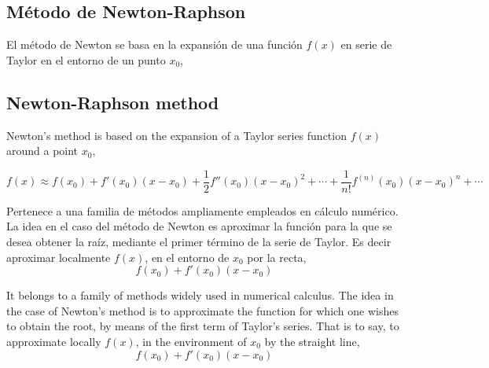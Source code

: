 
%

\begin{paracol}{2}
\subsection{Método de Newton-Raphson}
El método de Newton se basa en la expansión de una función $f(x)$ en serie de Taylor en el entorno de un punto $x_0$,

\switchcolumn
\subsection{Newton-Raphson method}
Newton's method is based on the expansion of a Taylor series function $f(x)$ around a point $x_0$,
\end{paracol}
\begin{equation*}
f(x)\approx f(x_0)+f'(x_0)(x-x_0)+\frac{1}{2}f''(x_0)(x-x_0)^2+\cdots+\frac{1}{n!}f^{(n)}(x_0)(x-x_0)^n+\cdots
\end{equation*}

\begin{paracol}{2}
 Pertenece a una familia de métodos ampliamente empleados en cálculo numérico. La idea en el caso del método de Newton es aproximar la función para la que se desea obtener la raíz, mediante el primer término de la serie de Taylor. Es decir aproximar localmente $f(x)$, en el entorno de $x_0$ por la recta,
\begin{equation*}
 f(x_0)+f'(x_0)(x-x_0)
\end{equation*}

\switchcolumn

 It belongs to a family of methods widely used in numerical calculus. The idea in the case of Newton's method is to approximate the function for which one wishes to obtain the root, by means of the first term of Taylor's series. That is to say, to approximate locally $f(x)$, in the environment of $x_0$ by the straight line,
\begin{equation*}
 f(x_0)+f'(x_0)(x-x_0)
\end{equation*}
\end{paracol}

